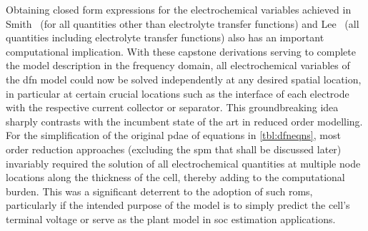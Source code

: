 Obtaining closed form expressions for  the electrochemical variables achieved in
Smith~\etal{} (for all quantities other than electrolyte transfer functions) and
Lee~\etal{} (all  quantities including electrolyte transfer  functions) also has
an important computational implication.  With these capstone derivations serving
to complete the  model description in the frequency  domain, all electrochemical
variables  of the  \gls{dfn}  model could  now be  solved  independently at  any
desired spatial location, in particular at certain crucial locations such as the
interface of each electrode with  the respective current collector or separator.
This groundbreaking idea  sharply contrasts with the incumbent state  of the art
in reduced order modelling. For the simplification of the original \gls{pdae} of
equations in \cref{tbl:dfneqns}, most order  reduction approaches (excluding the
\gls{spm} that shall be discussed later) invariably required the solution of all
electrochemical quantities at multiple node locations along the thickness of the
cell,  thereby  adding to  the  computational  burden.  This was  a  significant
deterrent  to the  adoption of  such \glspl{rom},  particularly if  the intended
purpose of the model  is to simply predict the cell's  terminal voltage or serve
as the plant model in \gls{soc} estimation applications.


